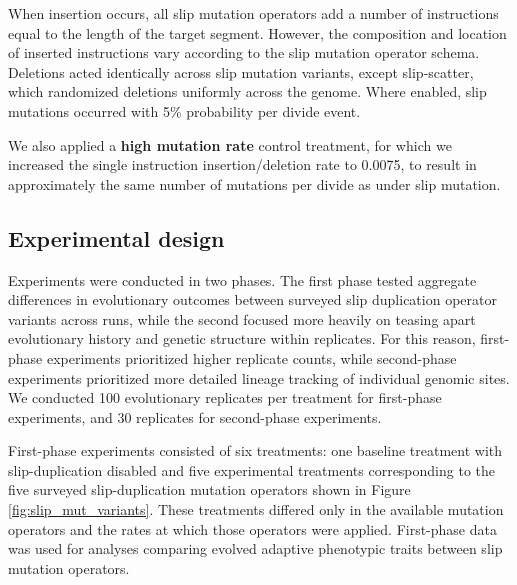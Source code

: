 When insertion occurs, all slip mutation operators add a number of instructions equal to the length of the target segment.
However, the composition and location of inserted instructions vary according to the slip mutation operator schema.
Deletions acted identically across slip mutation variants, except slip-scatter, which randomized deletions uniformly across the genome.
Where enabled, slip mutations occurred with 5\% probability per divide event.

We also applied a \textbf{high mutation rate} control treatment, for which we increased the single instruction insertion/deletion rate to 0.0075, to result in approximately the same number of mutations per divide as under slip mutation.

\subsection{Experimental design}

Experiments were conducted in two phases.
The first phase tested aggregate differences in evolutionary outcomes between surveyed slip duplication operator variants across runs, while the second focused more heavily on teasing apart evolutionary history and genetic structure within replicates.
For this reason, first-phase experiments prioritized higher replicate counts, while second-phase experiments prioritized more detailed lineage tracking of individual genomic sites.
We conducted 100 evolutionary replicates per treatment for first-phase experiments, and 30 replicates for second-phase experiments.

First-phase experiments consisted of six treatments: one baseline treatment with slip-duplication disabled and five experimental treatments corresponding to the five surveyed slip-duplication mutation operators shown in Figure \ref{fig:slip_mut_variants}.
These treatments differed only in the available mutation operators and the rates at which those operators were applied.
First-phase data was used for analyses comparing evolved adaptive phenotypic traits between slip mutation operators.


